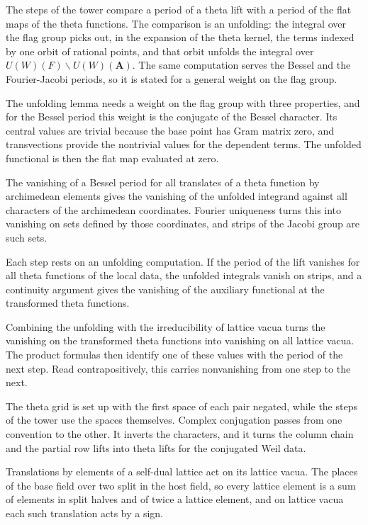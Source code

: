 The steps of the tower compare a period of a theta lift with a period of the
flat maps of the theta functions. The comparison is an unfolding: the
integral over the flag group picks out, in the expansion of the theta kernel,
the terms indexed by one orbit of rational points, and that orbit unfolds the
integral over $U(W)(F)\backslash U(W)(\mathbf A)$. The same computation serves
the Bessel and the Fourier-Jacobi periods, so it is stated for a general weight
on the flag group.

The unfolding lemma needs a weight on the flag group with three properties,
and for the Bessel period this weight is the conjugate of the Bessel
character. Its central values are trivial because the base point has Gram
matrix zero, and transvections provide the nontrivial values for the dependent
terms. The unfolded functional is then the flat map evaluated at zero.

The vanishing of a Bessel period for all translates of a theta function by
archimedean elements gives the vanishing of the unfolded integrand against all
characters of the archimedean coordinates. Fourier uniqueness turns this into
vanishing on sets defined by those coordinates, and strips of the Jacobi group
are such sets.

Each step rests on an unfolding computation. If the period of the lift
vanishes for all theta functions of the local data, the unfolded integrals
vanish on strips, and a continuity argument gives the vanishing of the
auxiliary functional at the transformed theta functions.

Combining the unfolding with the irreducibility of lattice vacua turns the
vanishing on the transformed theta functions into vanishing on all lattice
vacua. The product formulas then identify one of these values with the period
of the next step. Read contrapositively, this carries nonvanishing from one
step to the next.

The theta grid is set up with the first space of each pair negated, while the
steps of the tower use the spaces themselves. Complex conjugation passes from
one convention to the other. It inverts the characters, and it turns the
column chain and the partial row lifts into theta lifts for the conjugated Weil
data.

Translations by elements of a self-dual lattice act on its lattice vacua. The
places of the base field over two split in the host field, so every lattice
element is a sum of elements in split halves and of twice a lattice element,
and on lattice vacua each such translation acts by a sign.

